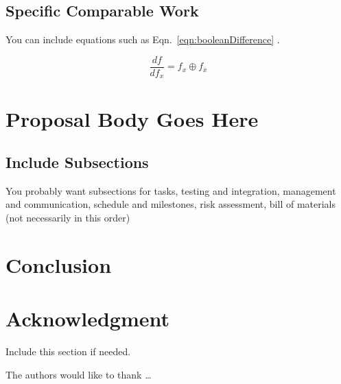 \documentclass[11pt,journal]{IEEEtran}
\begin{document}
\subsection{Specific Comparable Work}

You can include equations such as Eqn.~\ref{eqn:booleanDifference}
\cite{boole:book1872}.

\begin{equation}
  \frac{df}{df_x} = f_x \oplus f_{\overline{x}}
  \label{eqn:booleanDifference}
\end{equation}



\section{Proposal Body Goes Here}

\subsection{Include Subsections}

You probably want subsections for tasks, testing and integration,
management and communication, schedule and milestones, risk
assessment, bill of materials (not necessarily in this order)


% 


\section{Conclusion}



\section*{Acknowledgment}

Include this section if needed.

The authors would like to thank \ldots




\end{document}
